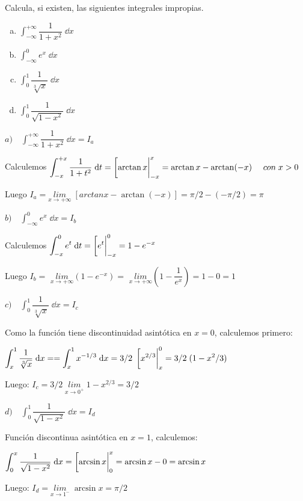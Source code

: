 \begin{ejre}
	Calcula, si existen, las siguientes integrales impropias.
	
	\begin{multicols}{2}
	\begin{enumerate}[a) ]
	\item $\displaystyle \int_{-\infty}^{+\infty} \dfrac {1}{1+x^2} \; \dd x$
	\item $\displaystyle \int_{-\infty}^{0} e^x \; \dd x$
	\item $\displaystyle \int_{0}^{1} \dfrac {1}{\sqrt[3]{x}} \; \dd x$
	\item $\displaystyle \int_{0}^{1} \dfrac {1}{\sqrt{1-x^2}} \; \dd x$
	\end{enumerate}
	\end{multicols}
	\end{ejre}
	\begin{proofw}\renewcommand{\qedsymbol}{$\diamond$}	


$a) \quad \displaystyle \int_{-\infty}^{+\infty} \dfrac {1}{1+x^2} \; \dd x=I_a$

Calculemos $\displaystyle \int_{-x}^{+x} \dfrac {1}{1+t^2} \; \dd t= \eval[\arctan x|_{-x}^x=\arctan x - \arctan(-x)\quad \ { con } \; x>0$

Luego $\displaystyle I_a= \underset{x\to +\infty}{lim}\;{\left[ arctan x - \arctan(-x) \right] } = \pi/2 - (-\pi/2)=\pi$


$b) \quad \displaystyle \int_{-\infty}^{0} e^x \; \dd x=I_b$

Calculemos $\displaystyle \int_{-x}^{0} e^t \; \dd t= \eval [e^t|_{-x}^0= 1-e^{-x}$

Luego $\displaystyle I_b=$
$\underset {x\to + \infty}{lim}{(1-e^{-x})}=$
$\underset {x\to + \infty}{lim}{\left(1-\dfrac {1}{e^x}\right)}=1-0=1$


$c) \quad \displaystyle \int_{0}^{1} \dfrac {1}{\sqrt[3]{x}} \; \dd x=I_c$

Como la función tiene discontinuidad asintótica en $x=0$, calculemos primero:

$\displaystyle \int_{x}^{1} \dfrac {1}{\sqrt[3]{x}} \; \dd x= =\int_{x}^{1} x^{-1/3} \; \dd x=3/2\;  \eval[x^{2/3}|_x^0= 3/2\; (1-x^2/3)$

Luego: $\displaystyle I_c=3/2 \; \underset{x\to 0^+}{lim}\; {1-x^{2/3}}= 3/2$


$d) \quad \displaystyle \int_{0}^{1} \dfrac {1}{\sqrt{1-x^2}} \; \dd x= I_d$

Función discontinua asintótica en $x=1$, calculemos:

$\displaystyle \int_{0}^{x} \dfrac {1}{\sqrt{1-x^2}} \; \dd x= \eval [\arcsin x|_0^x= \arcsin x - 0 = \arcsin x$

Luego: $\displaystyle I_d=\underset {x\to 1^-}{lim}\;{\arcsin x}= \pi/2$
\end{proofw}

